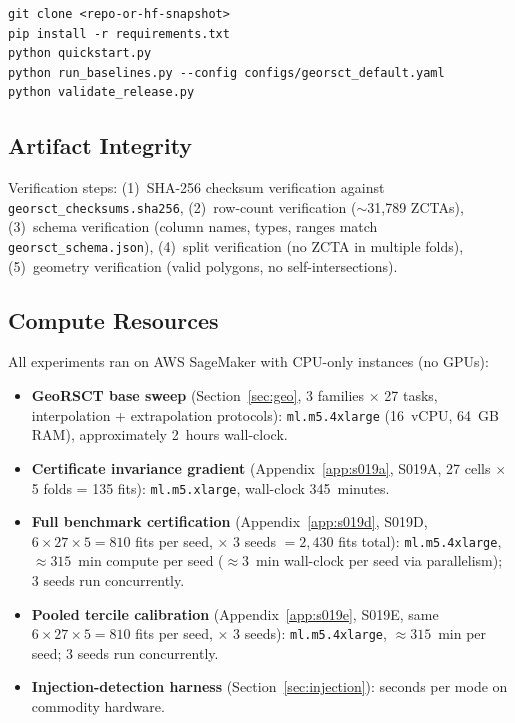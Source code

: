 \documentclass{article}
\begin{document}
\begin{verbatim}
git clone <repo-or-hf-snapshot>
pip install -r requirements.txt
python quickstart.py
python run_baselines.py --config configs/georsct_default.yaml
python validate_release.py
\end{verbatim}

\subsection{Artifact Integrity}

Verification steps: (1)~SHA-256 checksum verification against \texttt{georsct\_checksums.sha256}, (2)~row-count verification ($\sim$31{,}789 ZCTAs), (3)~schema verification (column names, types, ranges match \texttt{georsct\_schema.json}), (4)~split verification (no ZCTA in multiple folds), (5)~geometry verification (valid polygons, no self-intersections).

\subsection{Compute Resources}
\label{app:compute}

All experiments ran on AWS SageMaker with CPU-only instances (no GPUs):
\begin{itemize}
\item \textbf{GeoRSCT base sweep} (Section~\ref{sec:geo}, 3 families $\times$ 27 tasks, interpolation + extrapolation protocols): \texttt{ml.m5.4xlarge} (16~vCPU, 64~GB RAM), approximately 2~hours wall-clock.
\item \textbf{Certificate invariance gradient} (Appendix~\ref{app:s019a}, S019A, 27 cells $\times$ 5 folds = 135 fits): \texttt{ml.m5.xlarge}, wall-clock 345~minutes.
\item \textbf{Full benchmark certification} (Appendix~\ref{app:s019d}, S019D, $6 \times 27 \times 5 = 810$ fits per seed, $\times$ 3 seeds $= 2{,}430$ fits total): \texttt{ml.m5.4xlarge}, ${\approx}315$~min compute per seed (${\approx}3$~min wall-clock per seed via parallelism); 3 seeds run concurrently.
\item \textbf{Pooled tercile calibration} (Appendix~\ref{app:s019e}, S019E, same $6 \times 27 \times 5 = 810$ fits per seed, $\times$ 3 seeds): \texttt{ml.m5.4xlarge}, ${\approx}315$~min per seed; 3 seeds run concurrently.
\item \textbf{Injection-detection harness} (Section~\ref{sec:injection}): seconds per mode on commodity hardware.
\end{itemize}
\end{document}
